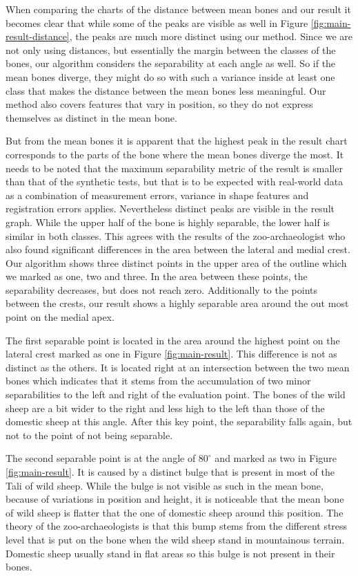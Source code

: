 \documentclass[pdftex,12pt,a4paper]{report}
\begin{document}
When comparing the charts of the distance between mean bones and our result it becomes clear that while some of the peaks are visible as well in Figure \ref{fig:main-result-distance}, the peaks are much more distinct using our method. Since we are not only using distances, but essentially the margin between the classes of the bones, our algorithm considers the separability at each angle as well. So if the mean bones diverge, they might do so with such a variance inside at least one class that makes the distance between the mean bones less meaningful. Our method also covers features that vary in position, so they do not express themselves as distinct in the mean bone.

But from the mean bones it is apparent that the highest peak in the result chart corresponds to the parts of the bone where the mean bones diverge the most. It needs to be noted that the maximum separability metric of the result is smaller than that of the synthetic tests, but that is to be expected with real-world data as a combination of measurement errors, variance in shape features and registration errors applies. Nevertheless distinct peaks are visible in the result graph. While the upper half of the bone is highly separable, the lower half is similar in both classes. This agrees with the results of the zoo-archaeologist who also found significant differences in the area between the lateral and medial crest. Our algorithm shows three distinct points in the upper area of the outline which we marked as one, two and three. In the area between these points, the separability decreases, but does not reach zero. Additionally to the points between the crests, our result shows a highly separable area around the out most point on the medial apex.

The first separable point is located in the area around the highest point on the lateral crest marked as one in Figure \ref{fig:main-result}. This difference is not as distinct as the others. It is located right at an intersection between the two mean bones which indicates that it stems from the accumulation of two minor separabilities to the left and right of the evaluation point. The bones of the wild sheep are a bit wider to the right and less high to the left than those of the domestic sheep at this angle. After this key point, the separability falls again, but not to the point of not being separable.

The second separable point is at the angle of $80^\circ$ and marked as two in Figure \ref{fig:main-result}. It is caused by a distinct bulge that is present in most of the Tali of wild sheep. While the bulge is not visible as such in the mean bone, because of variations in position and height, it is noticeable that the mean bone of wild sheep is flatter that the one of domestic sheep around this position. The theory of the zoo-archaeologists is that this bump stems from the different stress level that is put on the bone when the wild sheep stand in mountainous terrain. Domestic sheep usually stand in flat areas so this bulge is not present in their bones.
\end{document}
